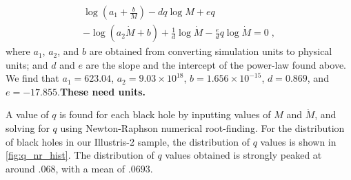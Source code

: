 \begin{multline*}
\log\left(a_{1}+\frac{b}{M}\right)-dq\log M+eq\\
-\log\left(a_{2}\dot{M}+b\right)+\frac{1}{d}\log\dot{M}-\frac{e}{d}q\log\dot{M}=0\;,
\end{multline*}
where $a_{1}$, $a_{2}$, and $b$ are obtained from converting simulation
units to physical units; and $d$ and $e$ are the slope and the intercept
of the power-law found above. We find that $a_{1}=623.04$, $a_{2}=9.03\times10^{18}$,
$b=1.656\times10^{-15}$, $d=0.869$, and $e=-17.855$.\textbf{These
need units.}

A value of $q$ is found for each black hole by inputting values of
$M$ and $\dot{M}$, and solving for $q$ using Newton-Raphson numerical
root-finding. For the distribution of black holes in our Illustris-2
sample, the distribution of $q$ values is shown in \ref{fig:q_nr_hist}.
The distribution of $q$ values obtained is strongly peaked at around
$.068$, with a mean of $.0693$.

